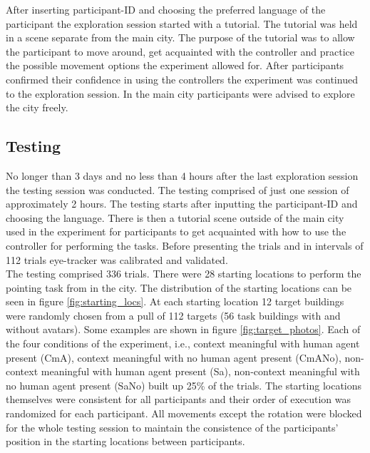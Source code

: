After inserting participant-ID and choosing the preferred language of the participant the exploration session started with a tutorial. The tutorial was held in a scene separate from the main city. The purpose of the tutorial was to allow the participant to move around, get acquainted with the controller and practice the possible movement options the experiment allowed for. After participants confirmed their confidence in using the controllers the experiment was continued to the exploration session. In the main city participants were advised to explore the city freely.

\subsection{Testing}

No longer than 3 days and no less than 4 hours after the last exploration session the testing session was conducted. The testing comprised of just one session of approximately 2 hours. The testing starts after inputting the participant-ID and choosing the language. There is then a tutorial scene outside of the main city used in the experiment for participants to get acquainted with how to use the controller for performing the tasks. Before presenting the trials and in intervals of 112 trials eye-tracker was calibrated and validated. \\

The testing comprised 336 trials. There were 28 starting locations to perform the pointing task from in the city. The distribution of the starting locations can be seen in figure \ref{fig:starting_locs}. At each starting location 12 target buildings were randomly chosen from a pull of 112 targets (56 task buildings with and without avatars). Some examples are shown in figure \ref{fig:target_photos}. Each of the four conditions of the experiment, i.e., context meaningful with human agent present {\emphasize(CmA)}, context meaningful with no human agent present {\emphasize(CmANo)}, non-context meaningful with human agent present {\emphasize(Sa)}, non-context meaningful with no human agent present {\emphasize(SaNo)} built up 25\% of the trials.  The starting locations themselves were consistent for all participants and their order of execution was randomized for each participant. All movements except the rotation were blocked for the whole testing session to maintain the consistence of the participants' position in the starting locations between participants. \\


